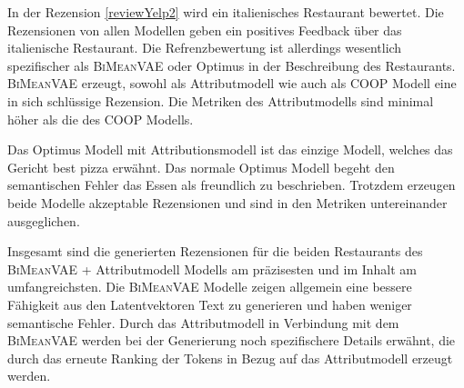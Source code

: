 In der Rezension \ref{reviewYelp2} wird ein italienisches Restaurant bewertet. 
Die Rezensionen von allen Modellen geben ein positives Feedback über das italienische Restaurant. 
Die Refrenzbewertung ist allerdings wesentlich spezifischer als \textsc{BiMeanVAE} oder Optimus in der Beschreibung des Restaurants.
\textsc{BiMeanVAE} erzeugt, sowohl als Attributmodell wie auch als COOP Modell eine in sich schlüssige Rezension. 
Die Metriken des Attributmodells sind minimal höher als die des COOP Modells.

Das Optimus Modell mit Attributionsmodell ist das einzige Modell, welches das Gericht \grqq{}best pizza\glqq{} erwähnt. 
Das normale Optimus Modell begeht den semantischen Fehler das Essen als freundlich zu beschrieben. 
Trotzdem erzeugen beide Modelle akzeptable Rezensionen und sind in den Metriken untereinander ausgeglichen.



Insgesamt sind die generierten Rezensionen für die beiden Restaurants des \textsc{BiMeanVAE} + Attributmodell Modells am präzisesten und im Inhalt am umfangreichsten. 
Die \textsc{BiMeanVAE} Modelle zeigen allgemein eine bessere Fähigkeit aus den Latentvektoren Text zu generieren und haben weniger semantische Fehler.
Durch das Attributmodell in Verbindung mit dem \textsc{BiMeanVAE} werden bei der Generierung noch spezifischere Details erwähnt, die durch das erneute Ranking der Tokens in Bezug auf das Attributmodell erzeugt werden.


\pagebreak
